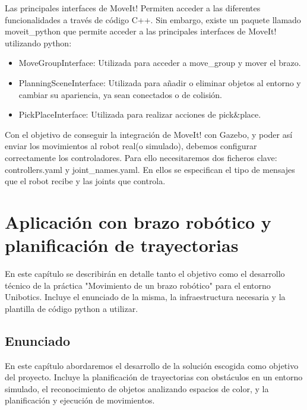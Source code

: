 \documentclass[12pt,spanish,chapterprefix, numbers=noenddot]{book}
\numberwithin{equation}{section}
\numberwithin{figure}{section}
\begin{document}
Las principales interfaces de MoveIt! Permiten acceder a las diferentes funcionalidades a través de código C++. Sin embargo, existe un paquete llamado moveit\_python que permite acceder a las principales interfaces de MoveIt! utilizando python:
\begin{itemize}
\item MoveGroupInterface: Utilizada para acceder a move\_group y mover el brazo. 
\item PlanningSceneInterface: Utilizada para añadir o eliminar objetos al entorno y cambiar su apariencia, ya sean conectados o de colisión. 
\item PickPlaceInterface: Utilizada para realizar acciones de pick\&place.
\end{itemize}

Con el objetivo de conseguir la integración de MoveIt! con Gazebo, y poder así enviar los movimientos al robot real(o simulado), debemos configurar correctamente los controladores. Para ello necesitaremos dos ficheros clave: controllers.yaml y joint\_names.yaml.  En ellos se especifican el tipo de mensajes que el robot recibe y las joints que controla.  

\chapter{Aplicación con brazo robótico y planificación de trayectorias}
En este capítulo se describirán en detalle tanto el objetivo como el desarrollo técnico de la práctica "Movimiento de un brazo robótico" para el entorno Unibotics. 
Incluye el enunciado de la misma, la infraestructura necesaria y la plantilla de código python a utilizar. 

\section{Enunciado}

En este capítulo abordaremos el desarrollo de la solución escogida como objetivo del proyecto. Incluye la planificación de trayectorias con obstáculos en un entorno simulado, el reconocimiento de objetos analizando espacios de color, y la planificación y ejecución de movimientos. 
\end{document}
